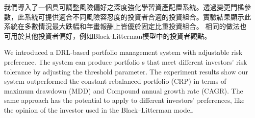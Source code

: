 \begin{abstractzh}
我們導入了一個具可調整風險偏好之深度強化學習資產配置系統。透過變更門檻參數，此系統可提供適合不同風險容忍度的投資者合適的投資組合。實驗結果顯示此系統在多數情況最大跌幅和年畫報酬上皆優於固定比重投資組合。
相同的做法也可用於其他投資者偏好，例如Black-Litterman模型中的投資者觀點\cite{black1992global}。 

\end{abstractzh}

\begin{abstracten}
We introduced a DRL-based portfolio management system with adjustable risk preference. The system can produce portfolio s that meet different investors' risk tolerance by adjusting the threshold parameter. The experiment results show our system outperformed the constant rebalanced portfolio (CRP) in terms of maximum drawdown (MDD) and Compound annual growth rate (CAGR). The same approach has the potential to apply to different investors' preferences, like the opinion of the investor used in the Black–Litterman model\cite{black1992global}. 
\end{abstracten}


